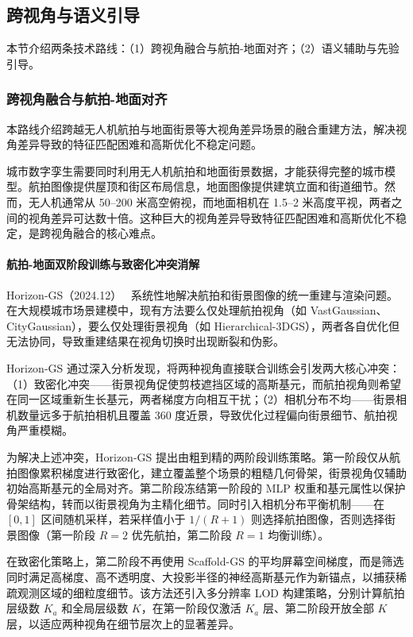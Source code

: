 \subsection{跨视角与语义引导}
\label{ss:14_2}

本节介绍两条技术路线：（1）跨视角融合与航拍-地面对齐；（2）语义辅助与先验引导。

\subsubsection{跨视角融合与航拍-地面对齐}

本路线介绍跨越无人机航拍与地面街景等大视角差异场景的融合重建方法，解决视角差异导致的特征匹配困难和高斯优化不稳定问题。

城市数字孪生需要同时利用无人机航拍和地面街景数据，才能获得完整的城市模型。航拍图像提供屋顶和街区布局信息，地面图像提供建筑立面和街道细节。然而，无人机通常从 50--200 米高空俯视，而地面相机在 1.5--2 米高度平视，两者之间的视角差异可达数十倍。这种巨大的视角差异导致特征匹配困难和高斯优化不稳定，是跨视角融合的核心难点。

\paragraph{航拍-地面双阶段训练与致密化冲突消解}

Horizon-GS（2024.12）~\cite{2412_01745} 系统性地解决航拍和街景图像的统一重建与渲染问题。在大规模城市场景建模中，现有方法要么仅处理航拍视角（如 VastGaussian、CityGaussian），要么仅处理街景视角（如 Hierarchical-3DGS），两者各自优化但无法协同，导致重建结果在视角切换时出现断裂和伪影。

Horizon-GS 通过深入分析发现，将两种视角直接联合训练会引发两大核心冲突：（1）致密化冲突——街景视角促使剪枝遮挡区域的高斯基元，而航拍视角则希望在同一区域重新生长基元，两者梯度方向相互干扰；（2）相机分布不均——街景相机数量远多于航拍相机且覆盖 360 度近景，导致优化过程偏向街景细节、航拍视角严重模糊。

为解决上述冲突，Horizon-GS 提出由粗到精的两阶段训练策略。第一阶段仅从航拍图像累积梯度进行致密化，建立覆盖整个场景的粗糙几何骨架，街景视角仅辅助初始高斯基元的全局对齐。第二阶段冻结第一阶段的 MLP 权重和基元属性以保护骨架结构，转而以街景视角为主精化细节。同时引入相机分布平衡机制——在 $[0,1]$ 区间随机采样，若采样值小于 $1/(R+1)$ 则选择航拍图像，否则选择街景图像（第一阶段 $R\!=\!2$ 优先航拍，第二阶段 $R\!=\!1$ 均衡训练）。

在致密化策略上，第二阶段不再使用 Scaffold-GS 的平均屏幕空间梯度，而是筛选同时满足高梯度、高不透明度、大投影半径的神经高斯基元作为新锚点，以捕获稀疏观测区域的细粒度细节。该方法还引入多分辨率 LOD 构建策略，分别计算航拍层级数 $K_a$ 和全局层级数 $K$，在第一阶段仅激活 $K_a$ 层、第二阶段开放全部 $K$ 层，以适应两种视角在细节层次上的显著差异。

